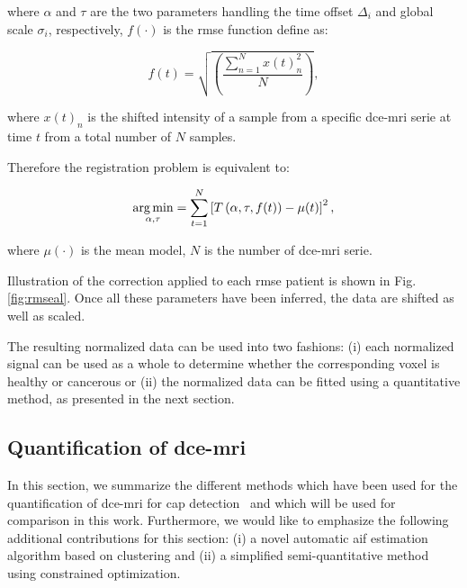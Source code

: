 \noindent where $\alpha$ and $\tau$ are the two parameters handling the time offset $\Delta_i$ and global scale $\sigma_i$, respectively, $f(\cdot)$ is the \ac{rmse} function define as:

\begin{equation}
  f(t) = \sqrt{ \left( \frac{\sum_{n=1}^{N} x(t)_{n}^2}{N}  \right) },
  \label{eq:rmsd}
\end{equation}

\noindent where $x(t)_n$ is the shifted intensity of a sample from a specific \ac{dce}-\ac{mri} serie at time $t$ from a total number of $N$ samples.

Therefore the registration problem is equivalent to:

\begin{equation}
  \operatorname*{arg\,min}_{\alpha, \tau} = \sum_{t=1}^{N} \left[ T\left(\alpha, \tau, f(t)\right) - \mu(t) \right]^{2} ,
  \label{eq:cost}
\end{equation}

\noindent where $\mu(\cdot)$ is the mean model, $N$ is the number of \ac{dce}-\ac{mri} serie.

Illustration of the correction applied to each \ac{rmse} patient is shown in Fig.\,\ref{fig:rmseal}.
Once all these parameters have been inferred, the data are shifted as well as scaled.

The resulting normalized data can be used into two fashions: (i) each normalized signal can be used as a whole to determine whether the corresponding voxel is healthy or cancerous or (ii) the normalized data can be fitted using a quantitative method, as presented in the next section.

\subsection{Quantification of \ac{dce}-\ac{mri}}\label{sec:stateart}

In this section, we summarize the different methods which have been used for the quantification of \ac{dce}-\ac{mri} for \ac{cap} detection~\citep{lemaitre2015computer} and which will be used for comparison in this work.
Furthermore, we would like to emphasize the following additional contributions for this section: (i) a novel automatic \ac{aif} estimation algorithm based on clustering and (ii) a simplified semi-quantitative method using constrained optimization.

